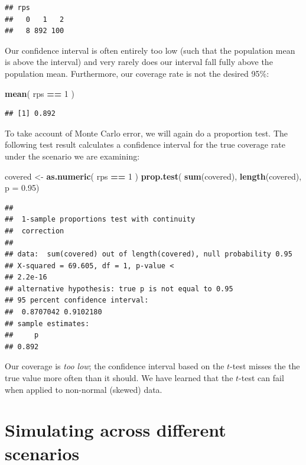 \documentclass[
]{book}
\newenvironment{Shaded}{\begin{snugshade}}{\end{snugshade}}
\newcommand{\AttributeTok}[1]{\textcolor[rgb]{0.13,0.29,0.53}{#1}}
\newcommand{\DecValTok}[1]{\textcolor[rgb]{0.00,0.00,0.81}{#1}}
\newcommand{\FloatTok}[1]{\textcolor[rgb]{0.00,0.00,0.81}{#1}}
\newcommand{\FunctionTok}[1]{\textcolor[rgb]{0.13,0.29,0.53}{\textbf{#1}}}
\newcommand{\NormalTok}[1]{#1}
\newcommand{\OtherTok}[1]{\textcolor[rgb]{0.56,0.35,0.01}{#1}}
\newcommand{\SpecialCharTok}[1]{\textcolor[rgb]{0.81,0.36,0.00}{\textbf{#1}}}
\begin{document}
\begin{verbatim}
## rps
##   0   1   2 
##   8 892 100
\end{verbatim}

Our confidence interval is often entirely too low (such that the population mean is above the interval) and very rarely does our interval fall fully above the population mean.
Furthermore, our coverage rate is not the desired 95\%:

\begin{Shaded}
\begin{Highlighting}[]
\FunctionTok{mean}\NormalTok{( rps }\SpecialCharTok{==} \DecValTok{1}\NormalTok{ )}
\end{Highlighting}
\end{Shaded}

\begin{verbatim}
## [1] 0.892
\end{verbatim}

To take account of Monte Carlo error, we will again do a proportion test.
The following test result calculates a confidence interval for the true coverage rate under the scenario we are examining:

\begin{Shaded}
\begin{Highlighting}[]
\NormalTok{covered }\OtherTok{\textless{}{-}} \FunctionTok{as.numeric}\NormalTok{( rps }\SpecialCharTok{==} \DecValTok{1}\NormalTok{ )}
\FunctionTok{prop.test}\NormalTok{( }\FunctionTok{sum}\NormalTok{(covered), }\FunctionTok{length}\NormalTok{(covered), }\AttributeTok{p =} \FloatTok{0.95}\NormalTok{)}
\end{Highlighting}
\end{Shaded}

\begin{verbatim}
## 
##  1-sample proportions test with continuity
##  correction
## 
## data:  sum(covered) out of length(covered), null probability 0.95
## X-squared = 69.605, df = 1, p-value <
## 2.2e-16
## alternative hypothesis: true p is not equal to 0.95
## 95 percent confidence interval:
##  0.8707042 0.9102180
## sample estimates:
##     p 
## 0.892
\end{verbatim}

Our coverage is \emph{too low}; the confidence interval based on the \(t\)-test misses the the true value more often than it should.
We have learned that the \(t\)-test can fail when applied to non-normal (skewed) data.

\section{Simulating across different scenarios}\label{simulating-across-different-scenarios}
\end{document}
